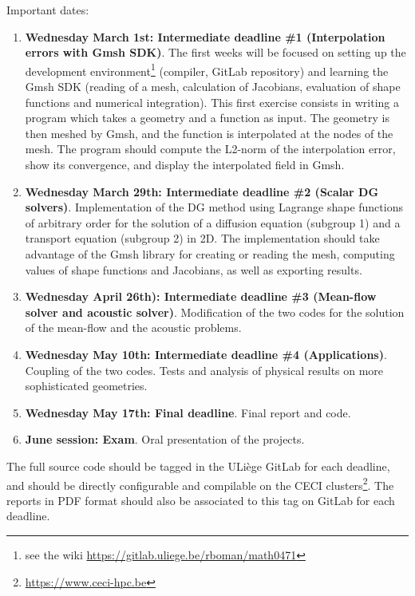 \documentclass[a4paper,12pt]{article}
\begin{document}
Important dates:
\begin{enumerate}
\item \textbf{Wednesday March 1st: Intermediate deadline \#1 (Interpolation errors with Gmsh SDK)}. The first weeks will be focused on setting up the development environment\footnote{see 
 the wiki \url{https://gitlab.uliege.be/rboman/math0471}} (compiler, GitLab repository) and learning the Gmsh SDK (reading of a mesh, calculation of Jacobians, evaluation of shape functions and numerical integration). This first exercise consists in writing a program which takes a geometry and a function as input. The geometry is then meshed by Gmsh, and the function is interpolated at the nodes of the mesh. The program should compute the L2-norm of the interpolation error, show its convergence, and display the interpolated field in Gmsh. 
\item \textbf{Wednesday March 29th: Intermediate deadline \#2 (Scalar DG solvers)}. Implementation of the DG method using Lagrange shape functions of arbitrary order for the solution of a diffusion equation (subgroup 1) and a transport equation (subgroup 2) in 2D.
The implementation should take advantage of the Gmsh library for creating or reading the mesh, computing values of shape functions and Jacobians, as well as exporting results. 
\item \textbf{Wednesday April 26th): Intermediate deadline \#3 (Mean-flow solver and acoustic solver)}. Modification of the two codes for the solution of the mean-flow and the acoustic problems.
\item \textbf{Wednesday May 10th: Intermediate deadline \#4 (Applications)}. Coupling of the two codes. Tests and analysis of physical results on more sophisticated geometries.
\item \textbf{Wednesday May 17th: Final deadline}. Final report and code.
\item \textbf{June session: Exam}. Oral presentation of the projects.
\end{enumerate}

\sloppypar The full source code should be tagged in the ULiège GitLab for each
deadline, and should be directly configurable and compilable on the CECI
clusters\footnote {\url{https://www.ceci-hpc.be}}. The reports in PDF format should also be associated to this tag on
GitLab for each deadline.
\end{document}

